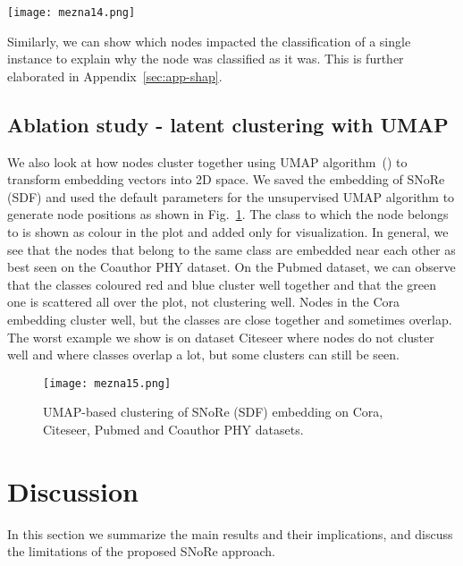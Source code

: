 \documentclass[twoside,11pt]{article}
\begin{document}
\begin{figure*}[t!]
  \centering
  \texttt{[image: mezna14.png]}
  \caption{SHAP summary on Pubmed dataset.}
  \label{fig:shap}
\end{figure*}

Similarly, we can show which nodes impacted the classification of a single instance to explain why the node was classified as it was. This is further elaborated in Appendix~\ref{sec:app-shap}.

\subsection{Ablation study - latent clustering with UMAP}
\label{sec:umap}
We also look at how nodes cluster together using UMAP algorithm~(\cite{lel2018umap}) to transform embedding vectors into 2D space. We saved the embedding of SNoRe (SDF) and used the default parameters for the unsupervised UMAP algorithm to generate node positions as shown in Fig.~\ref{fig:umap}. The class to which the node belongs to is shown as colour in the plot and added only for visualization. In general, we see that the nodes that belong to the same class are embedded near each other as best seen on the Coauthor PHY dataset. On the Pubmed dataset, we can observe that the classes coloured red and blue cluster well together and that the green one is scattered all over the plot, not clustering well. Nodes in the Cora embedding cluster well, but the classes are close together and sometimes overlap. The worst example we show is on dataset Citeseer where nodes do not cluster well and where classes overlap a lot, but some clusters can still be seen.

\begin{figure}[t!]
  \centering
  \texttt{[image: mezna15.png]}
  \caption{UMAP-based clustering of SNoRe (SDF) embedding on Cora, Citeseer, Pubmed and Coauthor PHY datasets.}
  \label{fig:umap}
\end{figure}

\section{Discussion}
\label{sec:discussion}
In this section we summarize the main results and their implications, and discuss the limitations of the proposed SNoRe approach.
\end{document}
